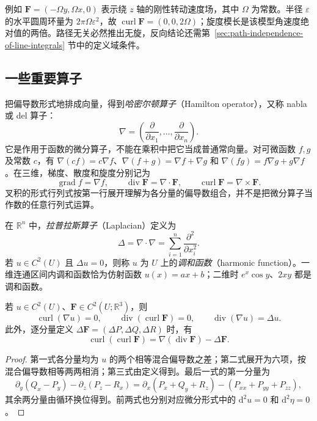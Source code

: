 \documentclass[UTF8,12pt,a4paper,fontset=fandol]{ctexbook}
\begin{document}
例如 $\boldsymbol F=(-\Omega y,\Omega x,0)$ 表示绕 $z$ 轴的刚性转动速度场，其中 $\Omega$ 为常数。半径 $\varepsilon$ 的水平圆周环量为 $2\pi\Omega\varepsilon^2$，故 $\operatorname{curl}\boldsymbol F=(0,0,2\Omega)$；旋度模长是该模型角速度绝对值的两倍。路径无关必然推出无旋，反向结论还需第~\ref{sec:path-independence-of-line-integrals} 节中的定义域条件。

\subsection{一些重要算子}
\label{subsec:important-field-operators}

把偏导数形式地排成向量，得到\emph{哈密尔顿算子}（Hamilton operator），又称 nabla 或 del 算子：
\[
    \nabla=\left(\frac{\partial}{\partial x_1},\ldots,
    \frac{\partial}{\partial x_n}\right).
\]
它是作用于函数的微分算子，不能在乘积中把它当成普通常向量。对可微函数 $f,g$ 及常数 $c$，有 $\nabla(cf)=c\nabla f$、$\nabla(f+g)=\nabla f+\nabla g$ 和 $\nabla(fg)=f\nabla g+g\nabla f$。在三维，梯度、散度和旋度分别记为
\[
    \operatorname{grad}f=\nabla f,\qquad
    \operatorname{div}\boldsymbol F=\nabla\cdot\boldsymbol F,\qquad
    \operatorname{curl}\boldsymbol F=\nabla\times\boldsymbol F.
\]
叉积的形式行列式按第一行展开理解为各分量的偏导数组合，并不是把微分算子当作数的任意行列式运算。

\begin{definition}
\label{def:laplacian-and-harmonic-function}
在 $\mathbb R^n$ 中，\emph{拉普拉斯算子}（Laplacian）定义为
\begin{equation}
\label{eq:laplace-operator}
    \Delta=\nabla\cdot\nabla
    =\sum_{i=1}^n\frac{\partial^2}{\partial x_i^2}.
\end{equation}
若 $u\in C^2(U)$ 且 $\Delta u=0$，则称 $u$ 为 $U$ 上的\emph{调和函数}（harmonic function）。一维连通区间内调和函数恰为仿射函数 $u(x)=ax+b$；二维时 $e^x\cos y$、$2xy$ 都是调和函数。
\end{definition}

\begin{proposition}
\label{prop:basic-vector-calculus-identities}
若 $u\in C^2(U)$、$\boldsymbol F\in C^2(U;\mathbb R^3)$，则
\begin{equation}
\label{eq:vector-calculus-identities}
    \operatorname{curl}(\nabla u)=0,\qquad
    \operatorname{div}(\operatorname{curl}\boldsymbol F)=0,
    \qquad \operatorname{div}(\nabla u)=\Delta u.
\end{equation}
此外，逐分量定义 $\Delta\boldsymbol F=(\Delta P,\Delta Q,\Delta R)$ 时，有
\[
    \operatorname{curl}(\operatorname{curl}\boldsymbol F)
    =\nabla(\operatorname{div}\boldsymbol F)-\Delta\boldsymbol F.
\]
\end{proposition}
\begin{proof}
第一式各分量均为 $u$ 的两个相等混合偏导数之差；第二式展开为六项，按混合偏导数相等两两相消；第三式由定义得到。最后一式的第一分量为
\[
    \partial_y(Q_x-P_y)-\partial_z(P_z-R_x)
    =\partial_x(P_x+Q_y+R_z)-(P_{xx}+P_{yy}+P_{zz}),
\]
其余两分量由循环换位得到。前两式也分别对应微分形式中的 $\mathrm d^2u=0$ 和 $\mathrm d^2\eta=0$。
\end{proof}
\end{document}
